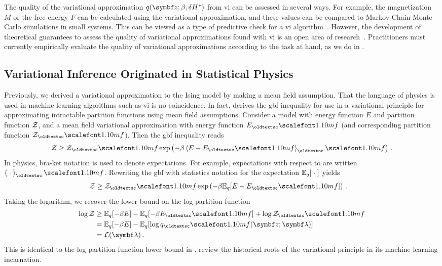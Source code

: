 The quality of the variational approximation $q(\mbz; \beta, \delta H^*)$ from \gls{vi} can be assessed in several ways. For example, the magnetization $M$ or the free energy $F$ can be calculated using the variational approximation, and these values can be compared to Markov Chain Monte Carlo simulations in small systems. This can be viewed as a type of predictive check for a \gls{vi} algorithm~\citep{blei2014build}. However, the development of theoretical guarantees to assess the quality of variational approximations found with \gls{vi} is an open area of research~\citep{wang2019frequentist}. Practitioners must currently empirically evaluate the quality of variational approximations according to the task at hand, as we do in .

\subsection{Variational Inference Originated in Statistical Physics}

Previously, we derived a variational approximation to the Ising model by making a mean field assumption. That the language of physics is used in machine learning algorithms such as \gls{vi} is no coincidence. In fact, \citet{feynman1972statistical,feynman2018statistical} derives the \gls{gbf} inequality for use in a variational principle for approximating intractable partition functions using mean field assumptions. Consider a model with energy function $E$ and partition function $\mathcal{Z}$, and a mean field variational approximation with energy function $E_\mf$ (and corresponding partition function $\cZ_\mf$). Then the \gls{gbf} inequality reads~\citep{feynman1972statistical,feynman2018statistical}
\begin{equation}
\cZ \geq \cZ_\mf\exp\left(-\beta \braket{E - E_\mf}_\mf\right) \, .
\label{eq:gbf-inequality}
\end{equation}
In physics, bra-ket notation is used to denote expectations. For example, expectations with respect to  are written $\braket{\; \cdot \;}_\mf$. Rewriting the \gls{gbf} with statistics notation for the expectation $\mathbb{E}_q[\;\cdot\;]$ yields
\begin{align}
 \cZ &\geq \cZ_\mf\exp\left(-\beta \E_q[E - E_\mf]\right) \, .
\end{align}
Taking the logarithm, we recover the lower bound on the log partition function
\begin{align}
 \log \cZ &\geq \E_q[-\beta E] - \E_q[-\beta E_\mf] + \log \cZ_\mf\\
 &= \E_q[-\beta E] - \E_q[\log q_\mf(\mbz; \mblambda)] \\
 &= \cL(\mblambda)\, .
\end{align}
This is identical to the log partition function lower bound in . \citet{hoffman2013stochastic} review the historical roots of the variational principle in its machine learning incarnation.

